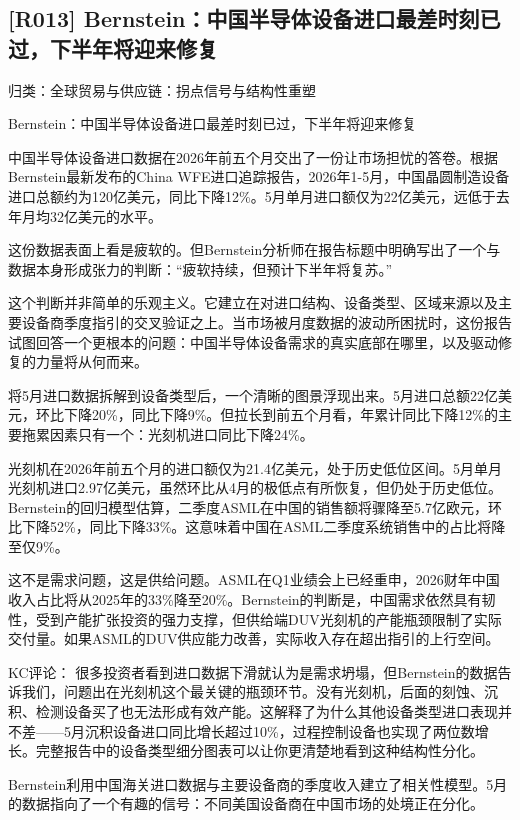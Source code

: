 \documentclass[11pt]{ctexart}
\begin{document}
\subsection{[R013] Bernstein：中国半导体设备进口最差时刻已过，下半年将迎来修复}
{\small\color{refgray}归类：全球贸易与供应链：拐点信号与结构性重塑}

Bernstein：中国半导体设备进口最差时刻已过，下半年将迎来修复

中国半导体设备进口数据在2026年前五个月交出了一份让市场担忧的答卷。根据Bernstein最新发布的China WFE进口追踪报告，2026年1-5月，中国晶圆制造设备进口总额约为120亿美元，同比下降12\%。5月单月进口额仅为22亿美元，远低于去年月均32亿美元的水平。

这份数据表面上看是疲软的。但Bernstein分析师在报告标题中明确写出了一个与数据本身形成张力的判断：“疲软持续，但预计下半年将复苏。”

这个判断并非简单的乐观主义。它建立在对进口结构、设备类型、区域来源以及主要设备商季度指引的交叉验证之上。当市场被月度数据的波动所困扰时，这份报告试图回答一个更根本的问题：中国半导体设备需求的真实底部在哪里，以及驱动修复的力量将从何而来。

将5月进口数据拆解到设备类型后，一个清晰的图景浮现出来。5月进口总额22亿美元，环比下降20\%，同比下降9\%。但拉长到前五个月看，年累计同比下降12\%的主要拖累因素只有一个：光刻机进口同比下降24\%。

光刻机在2026年前五个月的进口额仅为21.4亿美元，处于历史低位区间。5月单月光刻机进口2.97亿美元，虽然环比从4月的极低点有所恢复，但仍处于历史低位。Bernstein的回归模型估算，二季度ASML在中国的销售额将骤降至5.7亿欧元，环比下降52\%，同比下降33\%。这意味着中国在ASML二季度系统销售中的占比将降至仅9\%。

这不是需求问题，这是供给问题。ASML在Q1业绩会上已经重申，2026财年中国收入占比将从2025年的33\%降至20\%。Bernstein的判断是，中国需求依然具有韧性，受到产能扩张投资的强力支撑，但供给端DUV光刻机的产能瓶颈限制了实际交付量。如果ASML的DUV供应能力改善，实际收入存在超出指引的上行空间。

KC评论： 很多投资者看到进口数据下滑就认为是需求坍塌，但Bernstein的数据告诉我们，问题出在光刻机这个最关键的瓶颈环节。没有光刻机，后面的刻蚀、沉积、检测设备买了也无法形成有效产能。这解释了为什么其他设备类型进口表现并不差——5月沉积设备进口同比增长超过10\%，过程控制设备也实现了两位数增长。完整报告中的设备类型细分图表可以让你更清楚地看到这种结构性分化。

Bernstein利用中国海关进口数据与主要设备商的季度收入建立了相关性模型。5月的数据指向了一个有趣的信号：不同美国设备商在中国市场的处境正在分化。
\end{document}
